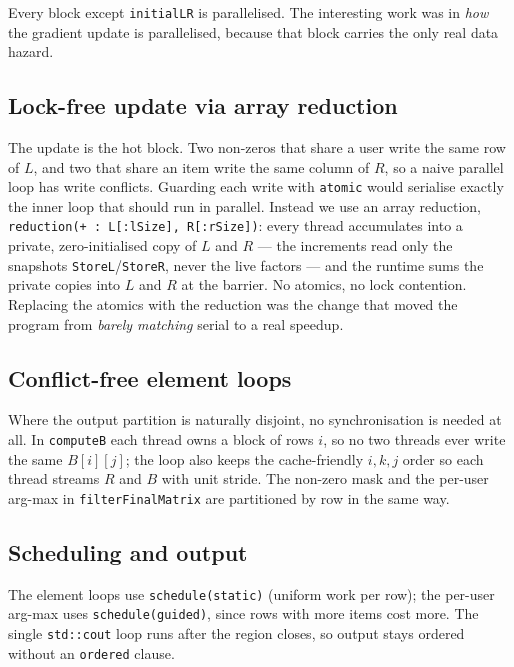 \documentclass[twocolumn]{article}
\begin{document}
    Every block except \texttt{initialLR} is parallelised. The interesting work was in
    \emph{how} the gradient update is parallelised, because that block carries the only
    real data hazard.

    \subsection{Lock-free update via array reduction}\label{subsec:reduction}
    The update is the hot block. Two non-zeros that share a user write the same row of
    $L$, and two that share an item write the same column of $R$, so a naive parallel
    loop has write conflicts. Guarding each write with \texttt{atomic} would serialise
    exactly the inner loop that should run in parallel. Instead we use an array
    reduction, \texttt{reduction(+ : L[:lSize], R[:rSize])}: every thread accumulates
    into a private, zero-initialised copy of $L$ and $R$ --- the increments read only the
    snapshots \texttt{StoreL}/\texttt{StoreR}, never the live factors --- and the runtime
    sums the private copies into $L$ and $R$ at the barrier. No atomics, no lock
    contention. Replacing the atomics with the reduction was the change that moved the
    program from \emph{barely matching} serial to a real speedup.

    \subsection{Conflict-free element loops}\label{subsec:conflictfree}
    Where the output partition is naturally disjoint, no synchronisation is needed at all.
    In \texttt{computeB} each thread owns a block of rows $i$, so no two threads ever
    write the same $B[i][j]$; the loop also keeps the cache-friendly $i,k,j$ order so each
    thread streams $R$ and $B$ with unit stride. The non-zero mask and the per-user
    arg-max in \texttt{filterFinalMatrix} are partitioned by row in the same way.

    \subsection{Scheduling and output}\label{subsec:scheduling}
    The element loops use \texttt{schedule(static)} (uniform work per row); the per-user
    arg-max uses \texttt{schedule(guided)}, since rows with more items cost more. The
    single \texttt{std::cout} loop runs after the region closes, so output stays ordered
    without an \texttt{ordered} clause.
\end{document}
